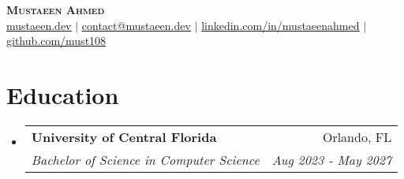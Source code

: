 \documentclass[letterpaper,11pt]{article}
\makeatletter
\newcommand{\resumeSubheading}[4]{
  \vspace{-2pt}\item
    \begin{tabular*}{0.97\textwidth}[t]{l@{\extracolsep{\fill}}r}
      \textbf{#1} & #2 \\
      \textit{\small#3} & \textit{\small #4} \\
    \end{tabular*}\vspace{-7pt}
}
\newcommand{\resumeSubHeadingListStart}{\begin{itemize}[leftmargin=0.15in, label={}]}
\newcommand{\resumeSubHeadingListEnd}{\end{itemize}}
\makeatother
\begin{document}

\vspace*{-0.65in} %
\begin{center}
    \textbf{\scshape Mustaeen Ahmed} \\ \vspace{1pt}
    \href{https://mustaeen.dev}{\ul{mustaeen.dev}} $|$ 
    \href{mailto:contact@mustaeen.dev}{\ul{contact@mustaeen.dev}} $|$ 
    \href{https://linkedin.com/in/mustaeenahmed}{\ul{linkedin.com/in/mustaeenahmed}} $|$
    \href{https://github.com/must108}{\ul{github.com/must108}} 
\end{center}


\vspace*{-0.24in} %
\section{Education}
  \resumeSubHeadingListStart
    \resumeSubheading
      {University of Central Florida}{Orlando, FL}
      {Bachelor of Science in Computer Science}{Aug 2023 - May 2027}
      
  \resumeSubHeadingListEnd

\end{document}

